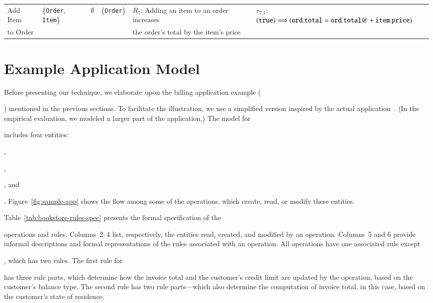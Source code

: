 \begin{table*}[t]
{\begin{tabular}{|l|l|l|l|l|l|}
Add Item & \{{\tt Order}, {\tt Item}\} &
\multicolumn{1}{|c|}{$\emptyset$} & \{{\tt Order}\} &
$R_7$: Adding an item to an order increases &
$r_{7.1}$: $({\tt true}) \Longrightarrow ({\tt ord.total} = {\tt ord.total@} +
{\tt item.price})$ \\
to Order & & & & the order's total by the item's price & \\
\hline
\end{tabular}
}
\vspace*{-3ex}
\label{tab:bookstore-rules-spec}
\end{table*}

\section{Example Application Model}
\label{sec:example}

Before presenting our technique, we elaborate upon the billing application
example (\subject{jBilling}) mentioned in the previous sections.
To facilitate the illustration, we use a simplified
version inspired by the actual application~\cite{jbilling}. (In the empirical
evaluation, we modeled a larger part of the application.) The model for
\subject{jBilling} includes four entities: \subject{Customer}, \subject{Item},
\subject{Order}, and \subject{Invoice}.  Figure~\ref{fig:sample-app} shows the
flow among some of the operations, which create, read, or modify these entities.

Table~\ref{tab:bookstore-rules-spec} presents the formal specification of the
\subject{jBilling} operations and rules. Columns~2--4 list, respectively, the
entities read, created, and modified by an operation. Columns~5 and 6 provide
informal descriptions and formal representations of the rules associated with an
operation. All operations have one associated rule except \subject{GenerateInvoice},
which has two rules. The first rule
for \subject{GenerateInvoice} has three rule parts, which determine how the
invoice total and the customer's credit limit are updated by the operation,
based on the customer's balance type.  The second rule has two rule parts---which also determine the
computation of invoice total, in this case, based on the customer's state of
residence.

